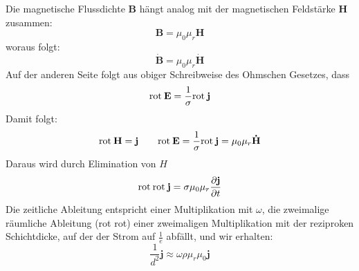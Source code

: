 Die magnetische Flussdichte $\mathbf B$ hängt analog mit der magnetischen Feldstärke $\mathbf H$ zusammen:
\begin{equation}
\mathbf B = \mu_0 \mu_r \mathbf H
\end{equation} 
woraus folgt:
\begin{equation}
\mathbf{\dot{B}} = \mu_0 \mu_r \mathbf{\dot{H}}
\end{equation} 
Auf der anderen Seite folgt aus obiger Schreibweise des Ohmschen Gesetzes, dass 
\begin{equation}
\mathrm{rot\:} \mathbf E = \frac{1}{\sigma} \mathrm{rot\:} \mathbf{j}
\end{equation}
Damit folgt:
\begin{equation}
\mathrm{rot\:} \mathbf H = \mathbf{j} \qquad
\mathrm{rot\:} \mathbf E = \frac{1}{\sigma} \mathrm{rot\:} \mathbf{j} = \mu_0 \mu_r \mathbf{\dot{H}}
\end{equation}
Daraus wird durch Elimination von $H$
\begin{equation}
\mathrm{rot\:}\mathrm{rot\:} \mathbf{j} = \sigma \mu_0 \mu_r \frac{\partial \mathbf{j}}{\partial t}
\end{equation}
Die zeitliche Ableitung entspricht einer Multiplikation mit $\omega$, die zweimalige räumliche Ableitung (rot rot) einer zweimaligen Multiplikation mit der reziproken Schichtdicke, auf der der Strom auf $\frac{1}{e}$ abfällt, und wir erhalten:
\begin{equation}
\frac{1}{d^2} \mathbf{j} \approx \omega \rho \mu_r \mu_0 \mathbf{j}
\end{equation}

